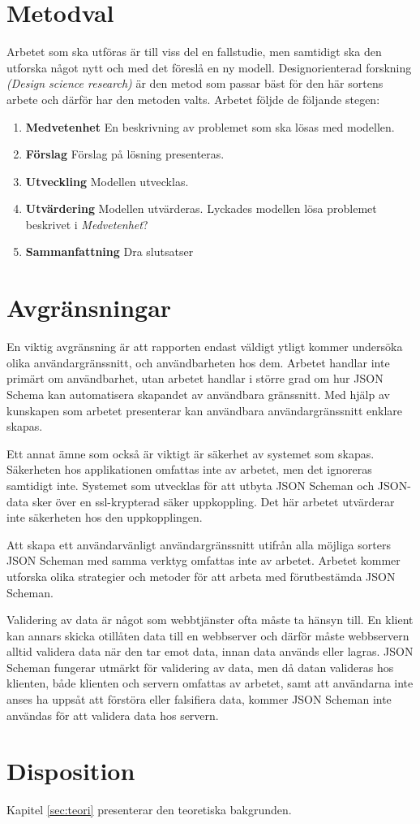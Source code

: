 \section{Metodval}
\label{sec:intro:metodval}
Arbetet som ska utföras är till viss del en fallstudie, men samtidigt ska den utforska något nytt och med det föreslå en ny modell. Designorienterad forskning \textit{(Design science research)} är den metod som passar bäst för den här sortens arbete och därför har den metoden valts.
\noindent
Arbetet följde de följande stegen:

\begin{enumerate}
	\item \textbf{Medvetenhet} En beskrivning av problemet som ska lösas med modellen.
	\item \textbf{Förslag} Förslag på lösning presenteras.
	\item \textbf{Utveckling} Modellen utvecklas.
	\item \textbf{Utvärdering} Modellen utvärderas. Lyckades modellen lösa problemet beskrivet i \textit{Medvetenhet}?
	\item \textbf{Sammanfattning} Dra slutsatser
\end{enumerate}

\section{Avgränsningar}
\label{sec:intro:avgränsningar}
En viktig avgränsning är att rapporten endast väldigt ytligt kommer undersöka olika användargränssnitt, och användbarheten hos dem. Arbetet handlar inte primärt om användbarhet, utan arbetet handlar i större grad om hur JSON Schema kan automatisera skapandet av användbara gränssnitt. Med hjälp av kunskapen som arbetet presenterar kan användbara användargränssnitt enklare skapas.

Ett annat ämne som också är viktigt är säkerhet av systemet som skapas. Säkerheten hos applikationen omfattas inte av arbetet, men det ignoreras samtidigt inte. Systemet som utvecklas för att utbyta JSON Scheman och JSON-data sker över en ssl-krypterad säker uppkoppling. Det här arbetet utvärderar inte säkerheten hos den uppkopplingen.

Att skapa ett användarvänligt användargränssnitt utifrån alla möjliga sorters JSON Scheman med samma verktyg omfattas inte av arbetet. Arbetet kommer utforska olika strategier och metoder för att arbeta med förutbestämda JSON Scheman.

Validering av data är något som webbtjänster ofta måste ta hänsyn till. En klient kan annars skicka otillåten data till en webbserver och därför måste webbservern alltid validera data när den tar emot data, innan data används eller lagras. JSON Scheman fungerar utmärkt för validering av data, men då datan valideras hos klienten, både klienten och servern omfattas av arbetet, samt att användarna inte anses ha uppsåt att förstöra eller falsifiera data, kommer JSON Scheman inte användas för att validera data hos servern.

\section{Disposition}
\label{sec:intro:disposition}
Kapitel \ref{sec:teori} presenterar den teoretiska bakgrunden.
